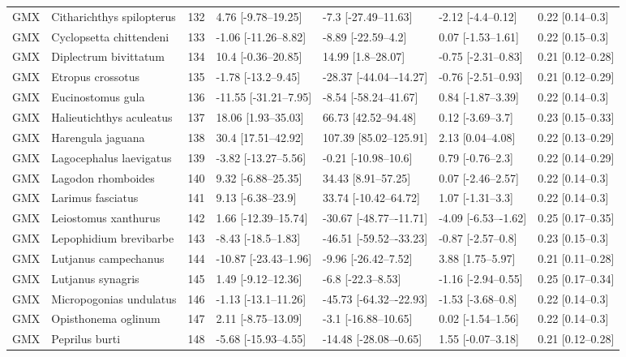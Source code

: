 \begin{longtable}[t]{lllllll}
GMX & Citharichthys spilopterus & 132 & 4.76 [-9.78–19.25] & -7.3 [-27.49–11.63] & -2.12 [-4.4–0.12] & 0.22 [0.14–0.3]\\
GMX & Cyclopsetta chittendeni & 133 & -1.06 [-11.26–8.82] & -8.89 [-22.59–4.2] & 0.07 [-1.53–1.61] & 0.22 [0.15–0.3]\\
GMX & Diplectrum bivittatum & 134 & 10.4 [-0.36–20.85] & 14.99 [1.8–28.07] & -0.75 [-2.31–0.83] & 0.21 [0.12–0.28]\\
GMX & Etropus crossotus & 135 & -1.78 [-13.2–9.45] & -28.37 [-44.04–-14.27] & -0.76 [-2.51–0.93] & 0.21 [0.12–0.29]\\
\addlinespace
GMX & Eucinostomus gula & 136 & -11.55 [-31.21–7.95] & -8.54 [-58.24–41.67] & 0.84 [-1.87–3.39] & 0.22 [0.14–0.3]\\
GMX & Halieutichthys aculeatus & 137 & 18.06 [1.93–35.03] & 66.73 [42.52–94.48] & 0.12 [-3.69–3.7] & 0.23 [0.15–0.33]\\
GMX & Harengula jaguana & 138 & 30.4 [17.51–42.92] & 107.39 [85.02–125.91] & 2.13 [0.04–4.08] & 0.22 [0.13–0.29]\\
GMX & Lagocephalus laevigatus & 139 & -3.82 [-13.27–5.56] & -0.21 [-10.98–10.6] & 0.79 [-0.76–2.3] & 0.22 [0.14–0.29]\\
GMX & Lagodon rhomboides & 140 & 9.32 [-6.88–25.35] & 34.43 [8.91–57.25] & 0.07 [-2.46–2.57] & 0.22 [0.14–0.3]\\
\addlinespace
GMX & Larimus fasciatus & 141 & 9.13 [-6.38–23.9] & 33.74 [-10.42–64.72] & 1.07 [-1.31–3.3] & 0.22 [0.14–0.3]\\
GMX & Leiostomus xanthurus & 142 & 1.66 [-12.39–15.74] & -30.67 [-48.77–-11.71] & -4.09 [-6.53–-1.62] & 0.25 [0.17–0.35]\\
GMX & Lepophidium brevibarbe & 143 & -8.43 [-18.5–1.83] & -46.51 [-59.52–-33.23] & -0.87 [-2.57–0.8] & 0.23 [0.15–0.3]\\
GMX & Lutjanus campechanus & 144 & -10.87 [-23.43–1.96] & -9.96 [-26.42–7.52] & 3.88 [1.75–5.97] & 0.21 [0.11–0.28]\\
GMX & Lutjanus synagris & 145 & 1.49 [-9.12–12.36] & -6.8 [-22.3–8.53] & -1.16 [-2.94–0.55] & 0.25 [0.17–0.34]\\
\addlinespace
GMX & Micropogonias undulatus & 146 & -1.13 [-13.1–11.26] & -45.73 [-64.32–-22.93] & -1.53 [-3.68–0.8] & 0.22 [0.14–0.3]\\
GMX & Opisthonema oglinum & 147 & 2.11 [-8.75–13.09] & -3.1 [-16.88–10.65] & 0.02 [-1.54–1.56] & 0.22 [0.14–0.3]\\
GMX & Peprilus burti & 148 & -5.68 [-15.93–4.55] & -14.48 [-28.08–-0.65] & 1.55 [-0.07–3.18] & 0.21 [0.12–0.28]\\

\end{longtable}
